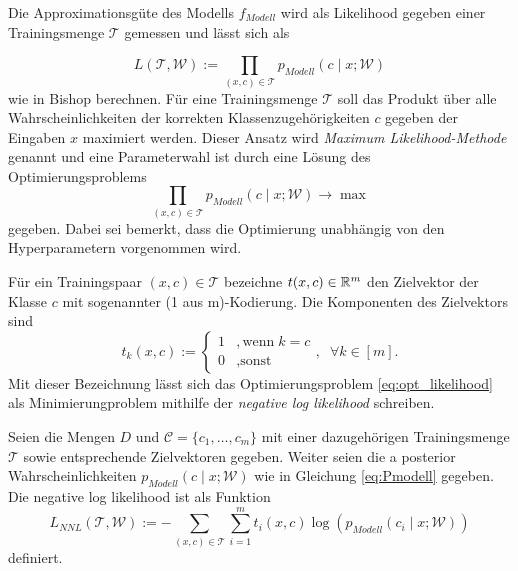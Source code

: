 Die Approximationsgüte des Modells $f_{Modell}$ wird als Likelihood gegeben einer Trainingsmenge $\mathcal{T}$ gemessen und lässt sich als 

\begin{equation}
    \label{eq:likelihood}
    L(\mathcal{T},\mathcal{W}):=\prod_{(x,c) \in \mathcal{T}} p_{Modell}(c \; | \; x; \mathcal{W})
\end{equation}
wie in Bishop\cite{bishop2006pattern} berechnen.
Für eine Trainingsmenge $\mathcal{T}$ soll das Produkt über alle Wahrscheinlichkeiten der korrekten Klassenzugehörigkeiten $c$ gegeben der Eingaben $x$ maximiert werden. Dieser Ansatz wird \textit{Maximum Likelihood-Methode}\cite{ruschendorf2014mathematische} genannt und eine Parameterwahl ist durch eine Lösung des Optimierungsproblems 
\begin{equation}
    \label{eq:opt_likelihood}
     \prod_{(x,c) \in \mathcal{T}} p_{Modell}(c \; | \; x; \mathcal{W}) \rightarrow \max
\end{equation}
gegeben. Dabei sei bemerkt, dass die Optimierung unabhängig von den Hyperparametern vorgenommen wird.

Für ein Trainingspaar $(x,c) \in \mathcal{T}$ bezeichne $t(x,c) \in \mathbb{R}^m$ den Zielvektor der Klasse $c$ mit sogenannter (1 aus m)-Kodierung. Die Komponenten des Zielvektors sind
\begin{equation*}
    t_k(x,c):= \begin{cases}
        1 &, \text{wenn} \; k=c \\
        0 &, \text{sonst}
    \end{cases}, \; \; \forall k \in [m].
\end{equation*} 
Mit dieser Bezeichnung lässt sich das Optimierungsproblem \ref{eq:opt_likelihood} als Minimierungproblem mithilfe der \textit{negative log likelihood} schreiben.
\begin{defi}
    Seien die Mengen $D$ und  $\mathcal{C}=\{c_1, \ldots, c_m\}$ mit einer dazugehörigen Trainingsmenge $\mathcal{T}$ sowie entsprechende Zielvektoren gegeben. Weiter seien die a posterior Wahrscheinlichkeiten $p_{Modell}(c \; | \; x; \mathcal{W})$ wie in Gleichung \ref{eq:Pmodell} gegeben. Die negative log likelihood ist als Funktion 
    \begin{equation}
        \label{eq:NLL}
        L_{NNL}(\mathcal{T},\mathcal{W}):= -\sum_{(x,c) \in \mathcal{T}}  \sum_{i=1}^m t_i(x,c) \log \left(p_{Modell}(c_i \; | \; x; \mathcal{W}) \right) 
    \end{equation}
    definiert.
\end{defi}

